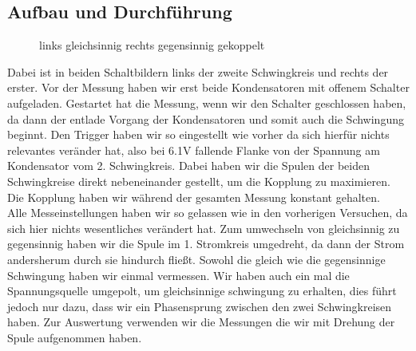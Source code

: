 \documentclass[twoside]{protokoll}
\begin{document}
\subsection{Aufbau und Durchführung}
\begin{figure}[H]
    \centering
    \hfill
    \caption{links gleichsinnig rechts gegensinnig gekoppelt}
\end{figure}
Dabei ist in beiden Schaltbildern links der zweite Schwingkreis und rechts der erster.
Vor der Messung haben wir erst beide Kondensatoren mit offenem Schalter aufgeladen.
Gestartet hat die Messung, wenn wir den Schalter geschlossen haben, da dann der entlade Vorgang der Kondensatoren und somit auch die Schwingung beginnt.
Den Trigger haben wir so eingestellt wie vorher da sich hierfür nichts relevantes veränder hat, also bei 6.1V fallende Flanke von der Spannung am Kondensator vom 2. Schwingkreis.
Dabei haben wir die Spulen der beiden Schwingkreise direkt nebeneinander gestellt, um die Kopplung zu maximieren.
Die Kopplung haben wir während der gesamten Messung konstant gehalten.\\

Alle Messeinstellungen haben wir so gelassen wie in den vorherigen Versuchen, da sich hier nichts wesentliches verändert hat.
Zum umwechseln von gleichsinnig zu gegensinnig haben wir die Spule im 1. Stromkreis umgedreht, da dann der Strom andersherum durch sie hindurch fließt.
Sowohl die gleich wie die gegensinnige Schwingung haben wir einmal vermessen.
Wir haben auch ein mal die Spannungsquelle umgepolt, um gleichsinnige schwingung zu erhalten, dies führt jedoch nur dazu, dass wir ein Phasensprung zwischen den zwei Schwingkreisen haben. 
Zur Auswertung verwenden wir die Messungen die wir mit Drehung der Spule aufgenommen haben.
\end{document}
